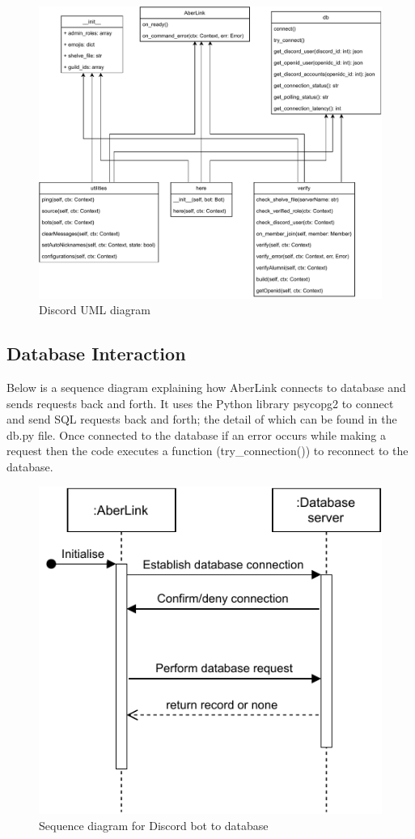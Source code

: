 \begin{figure}[H]
	\centering
	\includegraphics[width=1\linewidth]{Figures/discord-uml}
	\caption{Discord UML diagram}
	\label{fig:discord-uml}
\end{figure}

\subsection{Database Interaction}
Below is a sequence diagram explaining how AberLink connects to database and sends requests back and forth. It uses the Python library psycopg2 to connect and send SQL requests back and forth; the detail of which can be found in the db.py file. Once connected to the database if an error occurs while making a request then the code executes a function (try\_connection()) to reconnect to the database.
\begin{figure}[H]
	\centering
	\includegraphics[width=0.5\linewidth]{Figures/aberlink-sequence}
	\caption{Sequence diagram for Discord bot to database}
	\label{fig:architecture-dis-seq}
\end{figure}


